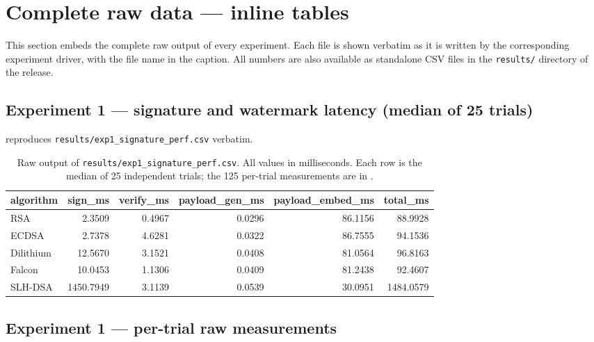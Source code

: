 \documentclass[11pt,a4paper]{article}
\begin{document}
\section{Complete raw data --- inline tables}
\label{sec:raw-csv}

This section embeds the complete raw output of every experiment.
Each file is shown verbatim as it is written by the corresponding
experiment driver, with the file name in the caption. All numbers
are also available as standalone CSV files in the \texttt{results/}
directory of the release.

\subsection{Experiment 1 --- signature and watermark latency (median of 25 trials)}

 reproduces \texttt{results/exp1\_signature\_perf.csv}
verbatim.

\begin{table}[!ht]\centering
\caption{Raw output of \texttt{results/exp1\_signature\_perf.csv}.
All values in milliseconds. Each row is the median of 25 independent
trials; the 125 per-trial measurements are in .}
\label{tab:raw-exp1}
\small
\begin{tabular}{l r r r r r}
\toprule
algorithm & sign\_ms & verify\_ms & payload\_gen\_ms & payload\_embed\_ms & total\_ms \\
\midrule
RSA       &    2.3509 & 0.4967 & 0.0296 & 86.1156 &    88.9928 \\
ECDSA     &    2.7378 & 4.6281 & 0.0322 & 86.7555 &    94.1536 \\
Dilithium &   12.5670 & 3.1521 & 0.0408 & 81.0564 &    96.8163 \\
Falcon    &   10.0453 & 1.1306 & 0.0409 & 81.2438 &    92.4607 \\
SLH-DSA   & 1450.7949 & 3.1139 & 0.0539 & 30.0951 & 1484.0579 \\
\bottomrule
\end{tabular}
\end{table}

\subsection{Experiment 1 --- per-trial raw measurements}
\end{document}

